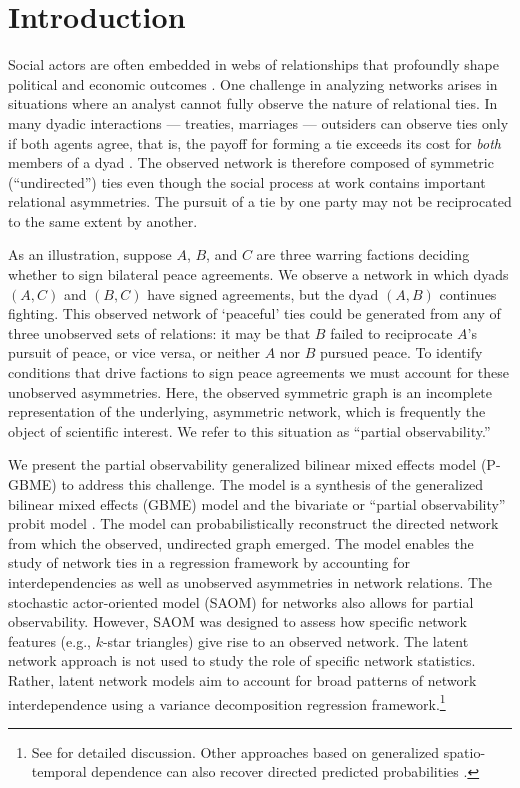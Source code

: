 \documentclass[a4paper, 12pt]{article}
\begin{document}
\clearpage

\singlespacing

\section{Introduction} %

Social actors are often embedded in webs of relationships that profoundly shape political and economic outcomes \citep{franzese:hays:2008,ward:etal:2011}. One challenge in analyzing networks arises in situations where an analyst cannot fully observe the nature of relational ties. In many dyadic interactions --- treaties, marriages --- outsiders can observe ties only if both agents agree, that is, the payoff for forming a tie exceeds its cost for \emph{both} members of a dyad \citep{jackson:wolinsky:1996}. The observed network is therefore composed of symmetric (``undirected'') ties even though the social process at work contains important relational asymmetries. The pursuit of a tie by one party may not be reciprocated to the same extent by another.

As an illustration, suppose $A$, $B$, and $C$ are three warring factions deciding whether to sign bilateral peace agreements. We observe a network in which dyads $(A, C)$ and $(B, C)$ have signed agreements, but the dyad $(A, B)$ continues fighting. This observed network of `peaceful' ties could be generated from any of  three unobserved sets of relations: it may be that $B$ failed to reciprocate $A$'s pursuit of peace, or vice versa, or neither $A$ nor $B$ pursued peace. To identify conditions that drive factions to sign peace agreements we must account for these unobserved asymmetries.  Here, the observed symmetric graph is an incomplete representation of the underlying, asymmetric network, which is frequently the object of scientific interest.  We refer to this situation as ``partial observability.'' 

We present the partial observability generalized bilinear mixed effects model (P-GBME) to address this challenge.  The model is a synthesis of the generalized bilinear mixed effects (GBME) model \citep{hoff:2005} and the bivariate or ``partial observability'' probit model \citep{poirier:1980, przeworski:vreel:2002}. The model can probabilistically reconstruct the directed network from which the observed, undirected graph emerged. The model enables the study of network ties in a regression framework by accounting for interdependencies as well as unobserved asymmetries in network relations. The stochastic actor-oriented model (SAOM) for networks \citep{snijders:pickup:2017} also allows for partial observability. However, SAOM was designed to assess how specific network features (e.g., $k$-star triangles) give rise to an observed network. The latent network approach is not used to study the role of specific network statistics.  Rather, latent network models aim to account for broad patterns of network interdependence using a variance decomposition regression framework.\footnote{See \citet{minhas:etal:2016:arxiv} for detailed discussion. Other approaches based on generalized spatio-temporal dependence can also recover directed predicted probabilities \citet{franzese:etal:2012}.}
\end{document}
